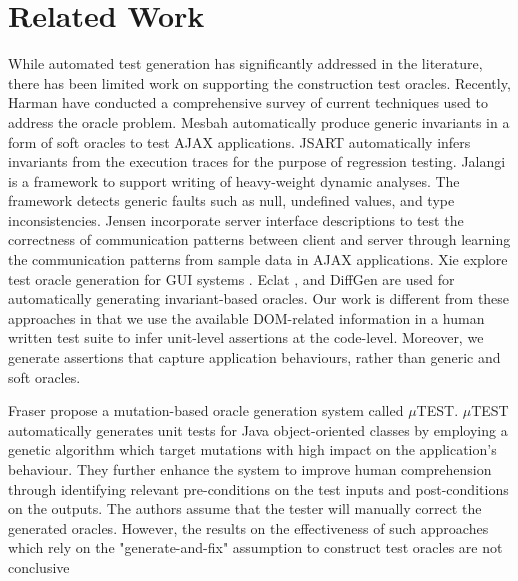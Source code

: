 \section{Related Work} \label{Sec:related}
While automated test generation has significantly addressed in the literature, there has been limited work on supporting the construction test oracles. Recently, Harman \etal \cite{harman:tech13} have conducted a comprehensive survey of current techniques used to address the oracle problem.
Mesbah \etal \cite{mesbah:tse12} automatically produce generic invariants in a form of soft oracles to test AJAX applications. JSART \cite{mirshokraie:icwe12} automatically infers \javascript invariants from the execution traces for the purpose of regression testing. Jalangi \cite{sen:fse13} is a framework to support writing of heavy-weight dynamic analyses. The framework detects generic \javascript faults such as null, undefined values, and type inconsistencies. Jensen \etal \cite{jensen:fse13} incorporate server interface descriptions to test the correctness of communication patterns between client and server through learning the communication patterns from sample data in AJAX applications.
Xie \etal explore test oracle generation for GUI systems \cite{xie:tosem07}. 
Eclat \cite{pacheco:ecoop05}, and DiffGen \cite{taneja:ase08} are used for automatically generating invariant-based oracles. 
Our work is different from these approaches in that we use the available DOM-related information in a human written test suite to infer unit-level assertions at the \javascript code-level. Moreover, we generate assertions that capture application behaviours, rather than generic and soft oracles. 

Fraser \etal \cite{fraser:tse12} propose a mutation-based oracle generation system called $\mu$TE\-ST. $\mu$TE\-ST automatically generates unit tests for Java object-oriented classes by employing a genetic algorithm which target mutations with high impact on the application's behaviour. They further enhance the system \cite{fraser:issta11} to improve human comprehension through identifying relevant pre-conditions on the test inputs and post-conditions on the outputs. The authors assume that the tester will manually correct the generated oracles. However, the results on the effectiveness of such approaches which rely on the "generate-and-fix" assumption to construct test oracles are not conclusive \cite{fraser:issta13}

